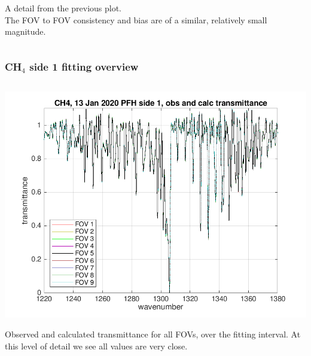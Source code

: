 \documentclass[10pt]{beamer}
\begin{document}
\begin{frame}
\begin{columns}[t]
\begin{column}{0.5\textwidth}
A detail from the previous plot. \\ The FOV to FOV consistency and
bias are of a similar, relatively small magnitude.

\end{column}
\end{columns}
\end{frame}
\begin{frame}
\frametitle{CH$_4$ side 1 fitting overview}
\begin{columns}[t]
\begin{column}{0.5\textwidth}  
  \begin{centering}
  \includegraphics[width=\textwidth]{01-13_pfh_s1_CH4/CH4_obs_and_calc.png}
  \end{centering}\vspace{3mm}

Observed and calculated transmittance for all FOVs, over the fitting
interval.  At this level of detail we see all values are very close.

\end{column}


\end{columns}
\end{frame}
\end{document}
